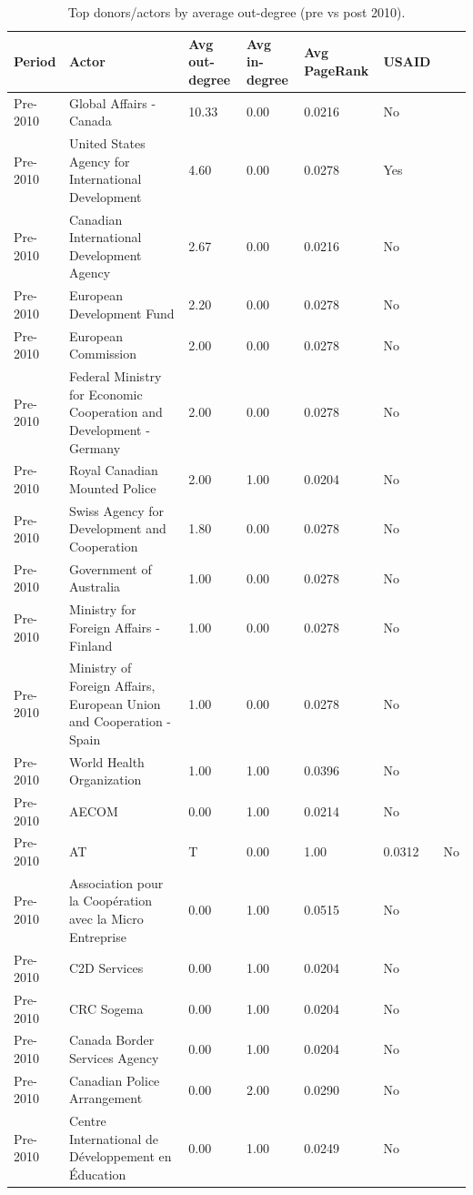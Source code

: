 \begin{table}[!ht]
\centering
\caption{Top donors/actors by average out-degree (pre vs post 2010).}
\label{tab:top_donors_pre_post}
\begin{tabular}{llllll}
\toprule
Period & Actor & Avg out-degree & Avg in-degree & Avg PageRank & USAID\\
\midrule
Pre-2010 & Global Affairs - Canada & 10.33 & 0.00 & 0.0216 & No\\
Pre-2010 & United States Agency for International Development & 4.60 & 0.00 & 0.0278 & Yes\\
Pre-2010 & Canadian International Development Agency & 2.67 & 0.00 & 0.0216 & No\\
Pre-2010 & European Development Fund & 2.20 & 0.00 & 0.0278 & No\\
Pre-2010 & European Commission & 2.00 & 0.00 & 0.0278 & No\\
Pre-2010 & Federal Ministry for Economic Cooperation and Development - Germany & 2.00 & 0.00 & 0.0278 & No\\
Pre-2010 & Royal Canadian Mounted Police & 2.00 & 1.00 & 0.0204 & No\\
Pre-2010 & Swiss Agency for Development and Cooperation & 1.80 & 0.00 & 0.0278 & No\\
Pre-2010 & Government of Australia & 1.00 & 0.00 & 0.0278 & No\\
Pre-2010 & Ministry for Foreign Affairs - Finland & 1.00 & 0.00 & 0.0278 & No\\
Pre-2010 & Ministry of Foreign Affairs, European Union and Cooperation - Spain & 1.00 & 0.00 & 0.0278 & No\\
Pre-2010 & World Health Organization & 1.00 & 1.00 & 0.0396 & No\\
Pre-2010 & AECOM & 0.00 & 1.00 & 0.0214 & No\\
Pre-2010 & AT&T & 0.00 & 1.00 & 0.0312 & No\\
Pre-2010 & Association pour la Coopération avec la Micro Entreprise & 0.00 & 1.00 & 0.0515 & No\\
Pre-2010 & C2D Services & 0.00 & 1.00 & 0.0204 & No\\
Pre-2010 & CRC Sogema & 0.00 & 1.00 & 0.0204 & No\\
Pre-2010 & Canada Border Services Agency & 0.00 & 1.00 & 0.0204 & No\\
Pre-2010 & Canadian Police Arrangement & 0.00 & 2.00 & 0.0290 & No\\
Pre-2010 & Centre International de Développement en Éducation & 0.00 & 1.00 & 0.0249 & No\\

\end{tabular}
\end{table}

